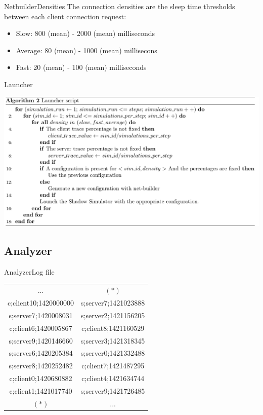 	\begin{frame}{Netbuilder}{Densities}
		The connection densities are the sleep time thresholds between each client connection request:
			
		\begin{itemize}
			\item Slow: 800 (mean) - 2000 (mean) milliseconds 			
			\item Average: 80 (mean)  - 1000 (mean) millisecons
			\item Fast: 20 (mean) - 100 (mean) milliseconds
		\end{itemize}
	\end{frame}			
	

	\begin{frame}{Launcher}
		\begin{center}
			\includegraphics[scale=0.30]{img/algolauncher.png}
		\end{center}				

	\end{frame}

\subsection{Analyzer}
	\begin{frame}{Analyzer}{Log file}
		\begin{center}
			\begin{tabular}{c | c}
			...&$(*)$\\
			c;client10;1420000000&
			s;server7;1421023888\\
			s;server7;1420008031&
			s;server2;1421156205\\
			c;client6;1420005867&
			c;client8;1421160529\\
			s;server9;1420146660&
			s;server3;1421318345\\
			s;server6;1420205384&
			s;server0;1421332488\\
			s;server8;1420252482&
			c;client7;1421487295\\
			c;client0;1420680882&
			c;client4;1421634744\\
			c;client1;1421017740&
			s;server9;1421726485\\
			$(*)$  & ...
			\end{tabular}	
		\end{center}
	\end{frame}

